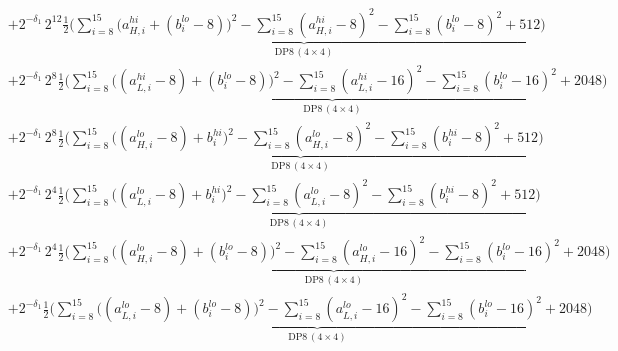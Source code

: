 \documentclass[fleqn]{article}
\newcommand{\DPop}[3]{\mathrm{DP#1}\,(#2\!\times\!#3)}
\begin{document}
{\begin{align*}
  & + 2^{-\delta_1}\,2^{12}\underbrace{\tfrac12\Big(\sum_{i=8}^{15}\big(a_{H,i}^{hi}{+}(b_i^{lo}{-}8)\big)^2 - \sum_{i=8}^{15}(a_{H,i}^{hi}{-}8)^2 - \sum_{i=8}^{15}(b_i^{lo}{-}8)^2 + 512\Big)}_{\DPop{8}{4}{4}} \\[0.15em]
  & + 2^{-\delta_1}\,2^{8}\underbrace{\tfrac12\Big(\sum_{i=8}^{15}\big((a_{L,i}^{hi}{-}8){+}(b_i^{lo}{-}8)\big)^2 - \sum_{i=8}^{15}(a_{L,i}^{hi}{-}16)^2 - \sum_{i=8}^{15}(b_i^{lo}{-}16)^2 + 2048\Big)}_{\DPop{8}{4}{4}} \\[0.15em]
  & + 2^{-\delta_1}\,2^{8}\underbrace{\tfrac12\Big(\sum_{i=8}^{15}\big((a_{H,i}^{lo}{-}8){+}b_i^{hi}\big)^2 - \sum_{i=8}^{15}(a_{H,i}^{lo}{-}8)^2 - \sum_{i=8}^{15}(b_i^{hi}{-}8)^2 + 512\Big)}_{\DPop{8}{4}{4}} \\[0.15em]
  & + 2^{-\delta_1}\,2^{4}\underbrace{\tfrac12\Big(\sum_{i=8}^{15}\big((a_{L,i}^{lo}{-}8){+}b_i^{hi}\big)^2 - \sum_{i=8}^{15}(a_{L,i}^{lo}{-}8)^2 - \sum_{i=8}^{15}(b_i^{hi}{-}8)^2 + 512\Big)}_{\DPop{8}{4}{4}} \\[0.15em]
  & + 2^{-\delta_1}\,2^{4}\underbrace{\tfrac12\Big(\sum_{i=8}^{15}\big((a_{H,i}^{lo}{-}8){+}(b_i^{lo}{-}8)\big)^2 - \sum_{i=8}^{15}(a_{H,i}^{lo}{-}16)^2 - \sum_{i=8}^{15}(b_i^{lo}{-}16)^2 + 2048\Big)}_{\DPop{8}{4}{4}} \\[0.15em]
  & + 2^{-\delta_1}\underbrace{\tfrac12\Big(\sum_{i=8}^{15}\big((a_{L,i}^{lo}{-}8){+}(b_i^{lo}{-}8)\big)^2 - \sum_{i=8}^{15}(a_{L,i}^{lo}{-}16)^2 - \sum_{i=8}^{15}(b_i^{lo}{-}16)^2 + 2048\Big)}_{\DPop{8}{4}{4}}
\end{align*}
}
\end{document}
